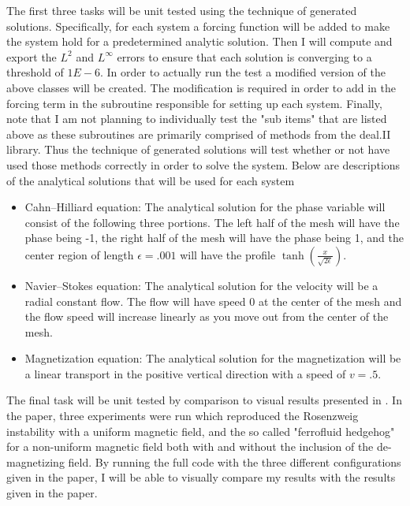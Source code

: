 \documentclass[11pt,fullpage]{article}
\newcommand{\eps}{\epsilon}
\theoremstyle{lemma}
\theoremstyle{definition}
\theoremstyle{lemma}
\begin{document}
The first three tasks will be unit tested using the technique of generated solutions. Specifically, for each system a forcing function will be added to make the system hold for a predetermined analytic solution. Then I will compute and export the $L^2$ and $L^\infty$ errors to ensure that each solution is converging to a threshold of $1E-6$. In order to actually run the test a modified version of the above classes will be created. The modification is required in order to add in the forcing term in the subroutine responsible for setting up each system. Finally, note that I am not planning to individually test the "sub items" that are listed above as these subroutines are primarily comprised of methods from the deal.II library. Thus the technique of generated solutions will test whether or not have used those methods correctly in order to solve the system. Below are descriptions of the analytical solutions that will be used for each system
\begin{itemize}
	\item Cahn--Hilliard equation: The analytical solution for the phase variable will consist of the following three portions. The left half of the mesh will have the phase being -1, the right half of the mesh will have the phase being 1, and the center region of length $\eps=.001$ will have the profile $\tanh(\frac{x}{\sqrt{2\eps}})$.
	
	\item Navier--Stokes equation: The analytical solution for the velocity will be a radial constant flow. The flow will have speed 0 at the center of the mesh and the flow speed will increase linearly as you move out from the center of the mesh.
	
	\item Magnetization equation: The analytical solution for the magnetization will be a linear transport in the positive vertical direction with a speed of $v=.5$.
\end{itemize}

The final task will be unit tested by comparison to visual results presented in \cite{DiffuseInterface}. In the paper, three experiments were run which reproduced the Rosenzweig instability with a uniform magnetic field, and the so called "ferrofluid hedgehog" for a non-uniform magnetic field both with and without the inclusion of the de-magnetizing field. By running the full code with the three different configurations given in the paper, I will be able to visually compare my results with the results given in the paper.

	


\end{document}
